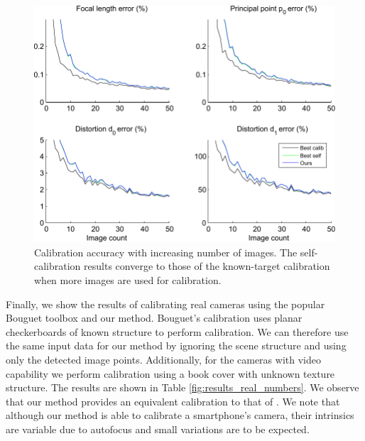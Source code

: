 \documentclass[10pt,twocolumn,letterpaper]{article}
\begin{document}
\begin{figure}
\centering
\includegraphics[width=\linewidth]{images/resultsFrameCount.pdf}
\caption{Calibration accuracy with increasing number of images. The self-calibration results converge to those of the known-target calibration when more images are used for calibration.}
\label{fig:results_frames}
\end{figure}

Finally, we show the results of calibrating real cameras using the popular Bouguet toolbox \cite{bouguetMCT} and our method. Bouguet's calibration uses planar checkerboards of known structure to perform calibration. We can therefore use the same input data for our method by ignoring the scene structure and using only the detected image points. Additionally, for the cameras with video capability we perform calibration using a book cover with unknown texture structure. The results are shown in Table \ref{fig:results_real_numbers}. We observe that our method provides an equivalent calibration to that of \cite{bouguetMCT}. We note that although our method is able to calibrate a smartphone's camera, their intrinsics are variable due to autofocus and small variations are to be expected.
\end{document}
